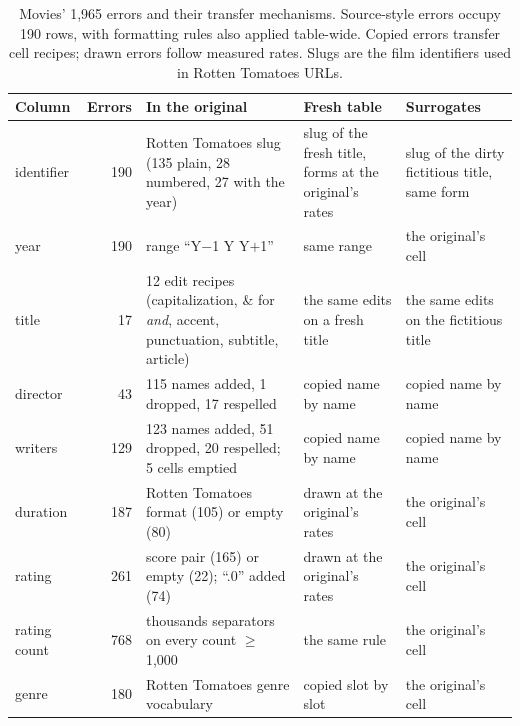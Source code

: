 \begin{table}[t]
  \caption{Movies' 1,965 errors and their transfer mechanisms. Source-style errors occupy
  190 rows, with formatting rules also applied table-wide. Copied errors transfer cell recipes;
  drawn errors follow measured rates. Slugs are the film identifiers used in Rotten Tomatoes URLs.}
  \label{tab:movieserrors}
  \small
  \begin{tabular}{@{}lr p{6.4cm} p{3.75cm} p{3.75cm}@{}}
    \toprule
    Column & Errors & In the original & Fresh table & Surrogates \\
    \midrule
    identifier & 190 & Rotten Tomatoes slug (135 plain, 28 numbered, 27 with the year) & slug of the fresh title, forms at the original's rates & slug of the dirty fictitious title, same form \\
    year & 190 & range ``Y$-$1 Y Y$+$1'' & same range & the original's cell \\
    title & 17 & 12 edit recipes (capitalization, \& for \emph{and}, accent, punctuation, subtitle, article) & the same edits on a fresh title & the same edits on the fictitious title \\
    director & 43 & 115 names added, 1 dropped, 17 respelled & copied name by name & copied name by name \\
    writers & 129 & 123 names added, 51 dropped, 20 respelled; 5 cells emptied & copied name by name & copied name by name \\
    duration & 187 & Rotten Tomatoes format (105) or empty (80) & drawn at the original's rates & the original's cell \\
    rating & 261 & score pair (165) or empty (22); ``.0'' added (74) & drawn at the original's rates & the original's cell \\
    rating count & 768 & thousands separators on every count $\geq$ 1,000 & the same rule & the original's cell \\
    genre & 180 & Rotten Tomatoes genre vocabulary & copied slot by slot & the original's cell \\
    \bottomrule
  \end{tabular}
\end{table}
